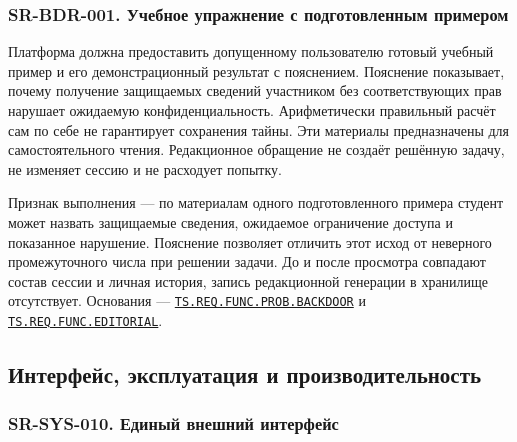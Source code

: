 \documentclass[12pt,a4paper]{article}
\begin{document}
\subsubsection{SR-BDR-001. Учебное упражнение с подготовленным примером}\label{sr-bdr-001-ux443ux447ux435ux431ux43dux43eux435-ux443ux43fux440ux430ux436ux43dux435ux43dux438ux435-ux441-ux43fux43eux434ux433ux43eux442ux43eux432ux43bux435ux43dux43dux44bux43c-ux43fux440ux438ux43cux435ux440ux43eux43c}

\hypertarget{sr-bdr-001-учебное-упражнение-с-подготовленным-примером}{}

\hypertarget{sr-bdr-001}{}

Платформа должна предоставить допущенному пользователю готовый учебный пример и его демонстрационный результат с пояснением. Пояснение показывает, почему получение защищаемых сведений участником без соответствующих прав нарушает ожидаемую конфиденциальность. Арифметически правильный расчёт сам по себе не гарантирует сохранения тайны. Эти материалы предназначены для самостоятельного чтения. Редакционное обращение не создаёт решённую задачу, не изменяет сессию и не расходует попытку.

Признак выполнения --- по материалам одного подготовленного примера студент может назвать защищаемые сведения, ожидаемое ограничение доступа и показанное нарушение. Пояснение позволяет отличить этот исход от неверного промежуточного числа при решении задачи. До и после просмотра совпадают состав сессии и личная история, запись редакционной генерации в хранилище отсутствует. Основания --- {\href{../02\_Техническое\_задание/Техническое\_задание.pdf\#ts-req-func-prob-backdoor}{\texttt{TS.\allowbreak{}REQ.\allowbreak{}FUNC.\allowbreak{}PROB.\allowbreak{}BACKDOOR}}} и {\href{../02\_Техническое\_задание/Техническое\_задание.pdf\#ts-req-func-editorial}{\texttt{TS.\allowbreak{}REQ.\allowbreak{}FUNC.\allowbreak{}EDITORIAL}}}.

\subsection{Интерфейс, эксплуатация и производительность}\label{ux438ux43dux442ux435ux440ux444ux435ux439ux441-ux44dux43aux441ux43fux43bux443ux430ux442ux430ux446ux438ux44f-ux438-ux43fux440ux43eux438ux437ux432ux43eux434ux438ux442ux435ux43bux44cux43dux43eux441ux442ux44c}

\hypertarget{интерфейс-эксплуатация-и-производительность}{}

\subsubsection{SR-SYS-010. Единый внешний интерфейс}\label{sr-sys-010-ux435ux434ux438ux43dux44bux439-ux432ux43dux435ux448ux43dux438ux439-ux438ux43dux442ux435ux440ux444ux435ux439ux441}
\end{document}
